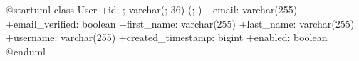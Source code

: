\begin{plantuml}

@startuml
class User {
    +id: ; varchar(; 36) (; )
    +email: varchar(255)
    +email_verified: boolean
    +first_name: varchar(255)
    +last_name: varchar(255)
    +username: varchar(255)
    +created_timestamp: bigint
    +enabled: boolean
}
@enduml

\end{plantuml}

